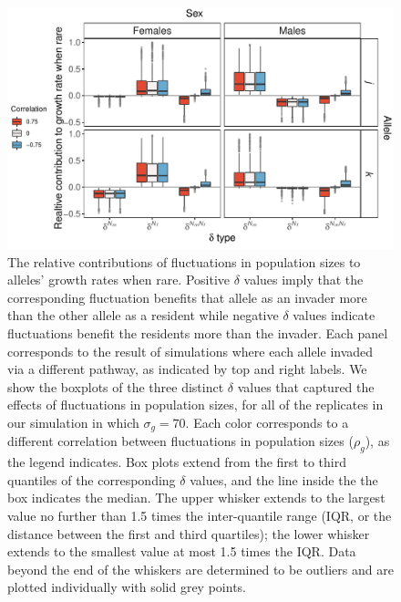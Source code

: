 \documentclass[12pt]{article}
\begin{document}
\begin{figure}[H]
  \centerline{\includegraphics[]{box_plots.pdf}}
  \caption{The relative contributions of fluctuations in population sizes to alleles' growth rates when rare. Positive $\delta$ values imply that the corresponding fluctuation benefits that allele as an invader more than the other allele as a resident while negative $\delta$ values indicate fluctuations benefit the residents more than the invader. Each panel corresponds to the result of simulations where each allele invaded via a different pathway, as indicated by top and right labels. We show the boxplots of the three distinct $\delta$ values that captured the effects of fluctuations in population sizes, for all of the replicates in our simulation in which $\sigma_{g}=70$. Each color corresponds to a different correlation between fluctuations in population sizes ($\rho_{g}$), as the legend indicates. Box plots extend from the first to third quantiles of the corresponding $\delta$ values, and the line inside the the box indicates the median. The upper whisker extends to the largest value no further than 1.5 times the inter-quantile range (IQR, or the distance between the first and third quartiles); the lower whisker extends to the smallest value at most 1.5 times the IQR. Data beyond the end of the whiskers are determined to be outliers and are plotted individually with solid grey points. }
    \label{fig:boxes}
\end{figure}
\end{document}
